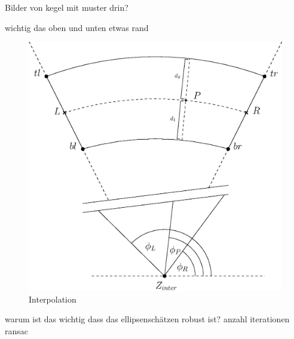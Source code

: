 Bilder von kegel mit muster drin?

wichtig das oben und unten etwas rand

\begin{figure}[!htb]
	\centering
	\includegraphics[scale=.6]{images/radialInterpolation.eps}
	\caption{Interpolation}
	\label{fig:Interpolation}
\end{figure}


warum ist das wichtig dass das ellipsenschätzen robust ist?
anzahl iterationen ransac
